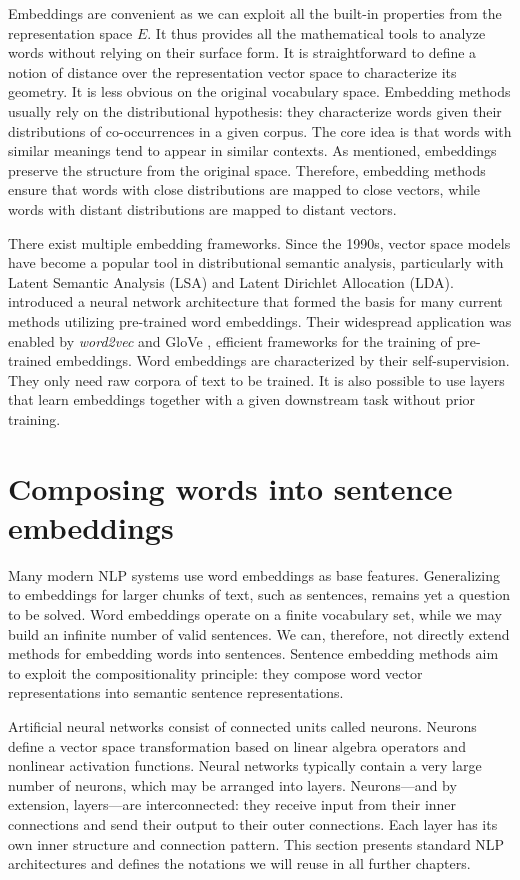 Embeddings are convenient as we can exploit all the built-in properties from the representation space $E$. It thus provides all the mathematical tools to analyze words without relying on their surface form. It is straightforward to define a notion of distance over the representation vector space to characterize its geometry. It is less obvious on the original vocabulary space. Embedding methods usually rely on the distributional hypothesis: they characterize words given their distributions of co-occurrences in a given corpus. The core idea is that words with similar meanings tend to appear in similar contexts. As mentioned, embeddings preserve the structure from the original space. Therefore, embedding methods ensure that words with close distributions are mapped to close vectors, while words with distant distributions are mapped to distant vectors.

There exist multiple embedding frameworks. Since the 1990s, vector space models have become a popular tool in distributional semantic analysis, particularly with Latent Semantic Analysis (LSA) and Latent Dirichlet Allocation (LDA). \textcite{collobert_08} introduced a neural network architecture that formed the basis for many current methods utilizing pre-trained word embeddings. Their widespread application was enabled by \textsl{word2vec} \parencite{mikolov_13a, mikolov_13b} and GloVe \parencite{pennington_14}, efficient frameworks for the training of pre-trained embeddings. Word embeddings are characterized by their self-supervision. They only need raw corpora of text to be trained. It is also possible to use layers that learn embeddings together with a given downstream task without prior training.

\section{Composing words into sentence embeddings}

Many modern NLP systems use word embeddings as base features. Generalizing to embeddings for larger chunks of text, such as sentences, remains yet a question to be solved. Word embeddings operate on a finite vocabulary set, while we may build an infinite number of valid sentences. We can, therefore, not directly extend methods for embedding words into sentences. Sentence embedding methods aim to exploit the compositionality principle: they compose word vector representations into semantic sentence representations.

Artificial neural networks consist of connected units called neurons. Neurons define a vector space transformation based on linear algebra operators and nonlinear activation functions. Neural networks typically contain a very large number of neurons, which may be arranged into layers. Neurons—and by extension, layers—are interconnected: they receive input from their inner connections and send their output to their outer connections. Each layer has its own inner structure and connection pattern. This section presents standard NLP architectures and defines the notations we will reuse in all further chapters.

